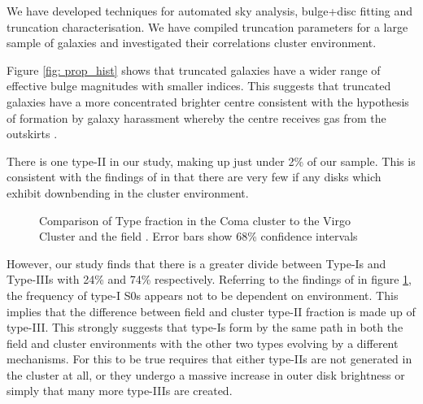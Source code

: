 
We have developed techniques for automated sky analysis, bulge+disc fitting and truncation characterisation. We have compiled truncation parameters for a large sample of galaxies and investigated their correlations cluster environment. 

Figure \ref{fig: prop_hist} shows that truncated galaxies have a wider range of effective bulge magnitudes with smaller \sersic indices. This suggests that truncated galaxies have a more concentrated brighter centre consistent with the hypothesis of formation by galaxy harassment whereby the centre receives gas from the outskirts \citep{moore_galaxy_1996}.

There is one type-II in our study, making up just under 2\% of our sample. This is consistent with the findings of \citet{erwin_strong_2012} in that there are very few if any disks which exhibit downbending in the cluster environment. 
\begin{figure}[h]
	\centering
	\caption{Comparison of Type fraction in the Coma cluster to the Virgo Cluster and the field \citep{erwin_strong_2012}. Error bars show 68\% confidence intervals \citep{wilson_probable_1927}}
	\label{fig: Erwin and mine}
\end{figure}

However, our study finds that there is a greater divide between Type-Is and Type-IIIs with 24\% and 74\% respectively. Referring to the findings of \citet{erwin_strong_2012} in figure \ref{fig: Erwin and mine}, the frequency of type-I S0s appears not to be dependent on environment. This implies that the difference between field and cluster type-II fraction is made up of type-III. This strongly suggests that type-Is form by the same path in both the field and cluster environments with the other two types evolving by a different mechanisms. For this to be true requires that either type-IIs are not generated in the cluster at all, or they undergo a massive increase in outer disk brightness or simply that many more type-IIIs are created. 

